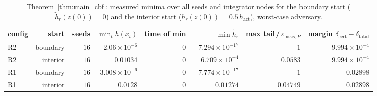 \begin{table}[t]
\centering
\caption{Theorem~\ref{thm:main_cbf}: measured minima over all seeds and integrator nodes for the boundary start ($\tilde h_r(z(0))=0$) and the interior start ($h_r(z(0))=0.5\,h_{\mathrm{act}}$), worst-case adversary.}
\label{tab:exp4_theorem1}
\footnotesize
\setlength{\tabcolsep}{3pt}
\begin{tabular}{lrrrrrrr}
\toprule
config & start & seeds & $\min_t h(x_t)$ & time of min & $\min \tilde h_r$ & max tail\,/\,$\varepsilon_{\mathrm{basis},P}$ & margin $\delta_{\mathrm{cert}}-\delta_{\mathrm{total}}$ \\
\midrule
R2 & boundary & $16$ & $2.06\times10^{-6}$ & $0$ & $-7.294\times10^{-17}$ & $1$ & $9.994\times10^{-4}$ \\
R2 & interior & $16$ & $0.01034$ & $0$ & $6.709\times10^{-4}$ & $0.0583$ & $9.994\times10^{-4}$ \\
R1 & boundary & $16$ & $3.008\times10^{-6}$ & $0$ & $-7.774\times10^{-17}$ & $1$ & $0.02898$ \\
R1 & interior & $16$ & $0.0128$ & $0$ & $0.01274$ & $0.04749$ & $0.02898$ \\
\bottomrule
\end{tabular}
\end{table}
